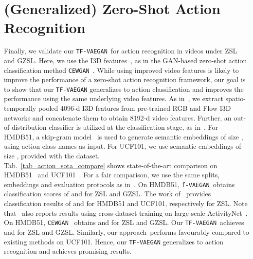 \documentclass[runningheads]{llncs}
\newcommand{\vaegan}{\texttt{f-VAEGAN}}
\newcommand{\proposed}{\texttt{TF-VAEGAN}}
\begin{document}
 
\section{(Generalized) Zero-Shot Action Recognition}
Finally, we validate our \proposed~for action recognition in videos under ZSL and GZSL.
Here, we use the I3D features~\cite{carreira17i3d}, as in the GAN-based zero-shot action classification method \texttt{CEWGAN}~\cite{Mandal19cvpr}. While using improved video features is likely to improve the performance of a zero-shot action recognition framework, our goal is to show that our \proposed{} generalizes to action classification and improves the performance using the same underlying video features. As in~\cite{Mandal19cvpr}, we extract spatio-temporally pooled 4096-d I3D features from pre-trained RGB and Flow I3D networks and concatenate them to obtain 8192-d video features. Further, an out-of-distribution classifier is utilized at the classification stage, as in~\cite{Mandal19cvpr}. For HMDB51, a skip-gram model~\cite{mikolov13w2v} is used to generate semantic embeddings of size , using action class names as input. For UCF101, we use semantic embeddings of size , provided with the dataset. \\
Tab.~\ref{tab_action_sota_compare} shows state-of-the-art comparison on HMDB51~\cite{hmdb51} and UCF101~\cite{ucf101}. For a fair comparison, we use the same splits, embeddings and evaluation protocols as in~\cite{Mandal19cvpr}. On HMDB51, \vaegan~obtains classification scores of  and  for ZSL and GZSL. The work of~\cite{uar18cvpr} provides classification results of  and  for HMDB51 and UCF101, respectively for ZSL. Note that~\cite{uar18cvpr} also reports results using cross-dataset training on large-scale ActivityNet~\cite{activitynet}. On HMDB51, \texttt{CEWGAN}~\cite{Mandal19cvpr} obtains  and  for ZSL and GZSL. Our \proposed~achieves  and  for ZSL and GZSL. Similarly, our approach~performs favourably compared to existing methods on UCF101. Hence, our \proposed{} generalizes to action recognition and achieves promising results. 
\end{document}
